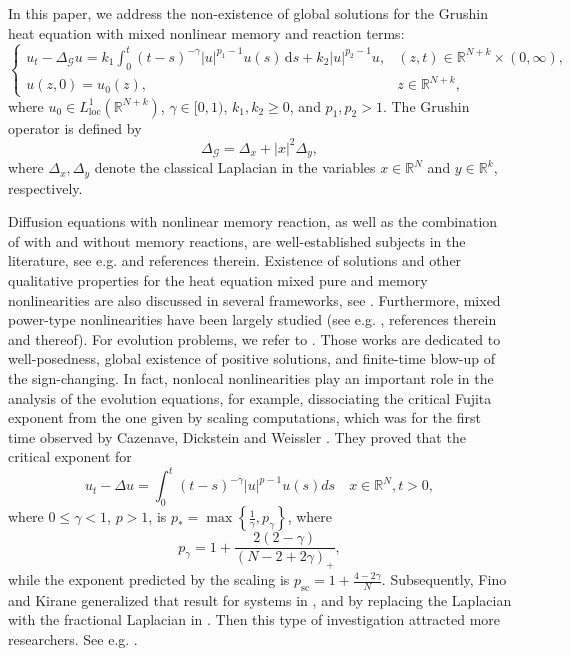 \documentclass[reqno,11pt]{amsart}
\numberwithin{equation}{section}
\def\R{{\mathbb {R}}}
\newcommand{\abs}[1]{\lvert#1\rvert}
\def\R{\mathbb{R}}
\begin{document}
In this paper, we address the non-existence of global solutions for the Grushin heat equation with mixed nonlinear memory and reaction terms:
\begin{equation}\label{*}
	\left\{\begin{array}{ll}
		\displaystyle {u_{t}-\Delta_{\mathcal{G}}
			u = k_1 \int_0^t(t-s)^{-\gamma}\abs{u}^{p_1-1}u(s)\,\mathrm{d}s} + k_2|u|^{p_2-1}u, &  (z,t)\in {\mathbb{R}}^{N+k}\times (0,\infty),\\
		\displaystyle{u(z,0)=  u_0(z),\qquad\qquad}&\displaystyle{z\in {\mathbb{R}}^{N+k},}
	\end{array}
	\right.
\end{equation}
where $u_0 \in L^1_{\mathrm{loc}}(\mathbb{R}^{N+k})$, $\gamma\in[0,1)$, $k_1,k_2\geq 0$, and $p_1,p_2>1$. The  Grushin operator is defined by
\begin{equation*}\label{Grushiop}
	\Delta_{\mathcal{G}}= \Delta_{x}+|x|^2\Delta_{y}, 
\end{equation*}
where $\Delta_x, \Delta_y$ denote the classical Laplacian in the variables $x\in\R^N$ and $y\in\R^k$, respectively. 



Diffusion equations with nonlinear memory reaction, as well as the combination of with and without memory reactions, are well-established subjects in the literature, see e.g. \cite{CDW,Be-87, deAn-Vi-17, Webb-78, Yam-88, Yam-84} and references therein. Existence of solutions and other qualitative properties for the heat equation mixed pure and memory nonlinearities are also discussed in several frameworks, see \cite{Ca-Vi-15, deAn-Vi-17, Gladkov-24, Soup-96, Zh-23}. Furthermore, mixed power-type nonlinearities have been largely studied (see e.g. \cite{Br-Ni-83}, references therein and thereof). For evolution problems, we refer to \cite{Alves-Bou-24, Fino-C-20, FVR-11, Loayza-06, Sli-17}. Those works are dedicated to well-posedness, global existence of positive solutions, and finite-time blow-up of the sign-changing. In fact,  nonlocal nonlinearities play an important role in the analysis of the evolution equations, for example, dissociating the critical Fujita exponent from the one given by scaling computations, which was for the first time observed by Cazenave, Dickstein and Weissler \cite{CDW}. They proved that the critical exponent for 
$$ u_t-\Delta u=\int_0^t(t-s)^{-\gamma}|u|^{p-1} u(s) d s \quad x \in \mathbb{R}^N, t>0 ,$$
where $0 \leq \gamma<1$, $p>1$, is $p_*=\max \left\{\frac{1}{\gamma}, p_\gamma\right\}$, where
\begin{equation}\label{FC-CDW}
	p_\gamma=1+\frac{2(2-\gamma)}{(N-2+2 \gamma)_{+}} ,	
\end{equation}
while the exponent predicted by the scaling is $p_{\mathrm{sc}}=1+\frac{4-2 \gamma}{N}$. Subsequently, Fino and Kirane generalized that result  for systems in \cite{Fino-Ki-11}, and by replacing the Laplacian with the fractional Laplacian in \cite{Fino-Ki-12}. Then this type of investigation attracted more researchers. See e.g. \cite{Cas-Loy-19,D-Ki-Fino-18,Ki-La-T-05,Loy-P-14}. 
\end{document}
